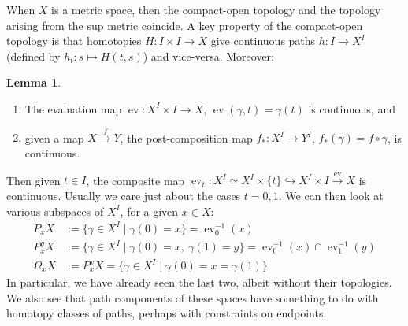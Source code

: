 \documentclass{tufte-handout}
\def\into {\hookrightarrow}
\DeclareMathOperator{\ev}{ev}
\theoremstyle{definition}
\newtheorem{lemma}{Lemma}
\begin{document}
When $X$ is a metric space, then the compact-open topology and the topology arising from the 
sup metric coincide. A key property of the compact-open topology is that homotopies
$H\colon I\times I \to X$ give continuous paths $h\colon I \to X^I$ (defined by $h_t\colon s\mapsto H(t,s)$) and vice-versa. Moreover:

\begin{lemma}

\begin{enumerate}
\item The evaluation map $\ev\colon X^I \times I\to X$, $\ev(\gamma,t) = \gamma(t)$ is continuous, and 
\item given a map $X\xrightarrow{f} Y$, the post-composition map $f_*\colon X^I \to Y^I$, $f_*(\gamma) = f\circ \gamma$, is continuous.
\end{enumerate}
\end{lemma}

Then given $t\in I$, the composite map $\ev_t\colon X^I \simeq X^I\times\{t\} \into X^I \times I \xrightarrow{\ev} X$ is continuous.
Usually we care just about the cases $t=0,1$. 
We can then look at various subspaces of $X^I$, for a given $x\in X$:
\begin{align*}
P_xX & := \{\gamma \in X^I\mid \gamma(0)=x\} = \ev_0^{-1}(x)\\
P_x^yX & := \{\gamma \in X^I\mid \gamma(0)=x,\ \gamma(1)=y\} = \ev_0^{-1}(x)\cap \ev_1^{-1}(y)\\
\Omega_x X & := P_x^x X = \{\gamma \in X^I \mid \gamma(0) = x = \gamma(1)\}
\end{align*}
In particular, we have already seen the last two, albeit without their topologies. We also see that path 
components of these spaces have something to do with homotopy classes of paths, perhaps with
constraints on endpoints.
\end{document}
